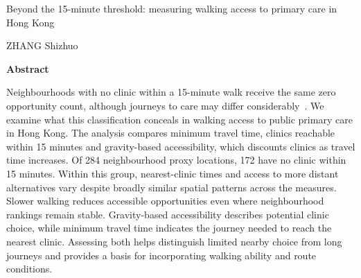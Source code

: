 \documentclass[10pt,a4paper]{article}
\begin{document}
{\fontsize{22}{25}\selectfont\bfseries\raggedright
Beyond the 15-minute threshold: measuring walking access to primary care in Hong Kong\par}
{\small ZHANG Shizhuo\par}
\vspace{7pt}

{\fontsize{11}{14}\selectfont
\textbf{Abstract}\par\vspace{3pt}
Neighbourhoods with no clinic within a 15-minute walk receive the same zero opportunity count, although journeys to care may differ considerably~\cite{moreno2021,tomasiello2023}. We examine what this classification conceals in walking access to public primary care in Hong Kong. The analysis compares minimum travel time, clinics reachable within 15 minutes and gravity-based accessibility, which discounts clinics as travel time increases. Of 284 neighbourhood proxy locations, 172 have no clinic within 15 minutes. Within this group, nearest-clinic times and access to more distant alternatives vary despite broadly similar spatial patterns across the measures. Slower walking reduces accessible opportunities even where neighbourhood rankings remain stable. Gravity-based accessibility describes potential clinic choice, while minimum travel time indicates the journey needed to reach the nearest clinic. Assessing both helps distinguish limited nearby choice from long journeys and provides a basis for incorporating walking ability and route conditions.\par}
\vspace{5pt}
\end{document}
